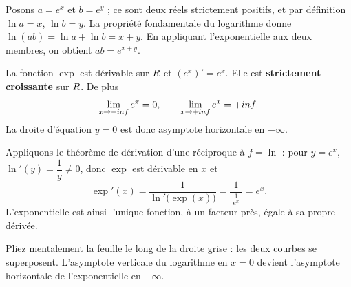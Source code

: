\begin{demonstration}[de la relation $e^{x+y} = e^{x}e^{y}$]
Posons $a = e^{x}$ et $b = e^{y}$ ; ce sont deux réels strictement positifs, et
par définition $\ln a = x$, $\ln b = y$. La propriété fondamentale du
logarithme donne $\ln(ab) = \ln a + \ln b = x+y$. En appliquant
l'exponentielle aux deux membres, on obtient $ab = e^{x+y}$.
\end{demonstration}

\begin{propriete}
La fonction $\exp$ est dérivable sur $R$ et $\left(e^{x}\right)' = e^{x}$.
Elle est \textbf{strictement croissante} sur $R$. De plus
\[
  \limminf e^{x} = 0, \qquad \limpinf e^{x} = +\infty .
\]
La droite d'équation $y = 0$ est donc asymptote horizontale en $-\infty$.
\end{propriete}

\begin{demonstration}[de la dérivée]
Appliquons le théorème de dérivation d'une réciproque à $f = \ln$ : pour
$y = e^{x}$, $\ln'(y) = \dfrac{1}{y} \neq 0$, donc $\exp$ est dérivable en $x$
et
\[
  \exp'(x) = \frac{1}{\ln'\bigl(\exp(x)\bigr)} = \frac{1}{\ \frac{1}{e^{x}}\ } = e^{x}.
\]
L'exponentielle est ainsi l'unique fonction, à un facteur près, égale à sa
propre dérivée.
\end{demonstration}

\begin{visualisation}
\begin{center}
\end{center}

Pliez mentalement la feuille le long de la droite grise : les deux courbes se
superposent. L'asymptote verticale du logarithme en $x=0$ devient l'asymptote
horizontale de l'exponentielle en $-\infty$.
\end{visualisation}


